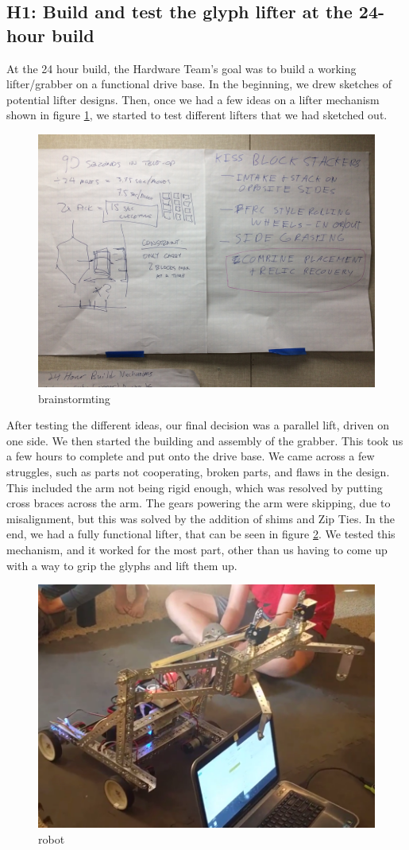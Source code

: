 \documentclass{article}
\begin{document}
\subsection{H1: Build and test the glyph lifter at the 24-hour build}

At the 24 hour build, the Hardware Team's goal was to build a working lifter/grabber on a functional drive base. In the beginning, we drew sketches of potential lifter designs. Then, once we had a few ideas on a lifter mechanism shown in figure \ref{fig:brainstorm}, we started to test different lifters that we had sketched out. 
\begin{figure}[h]
    \centering
    \includegraphics[width=.6\textwidth]{01/images/brainstorm.jpg}
    \caption{brainstormting}
    \label{fig:brainstorm}
\end{figure}
After testing the different ideas, our final decision was a parallel lift, driven on one side. We then started the building and assembly of the grabber. This took us a few hours to complete and put onto the drive base. We came across a few struggles, such as parts not cooperating, broken parts, and flaws in the design. This included the arm not being rigid enough, which was resolved by putting cross braces across the arm. The gears powering the arm were skipping, due to misalignment, but this was solved by the addition of shims and Zip Ties. In the end, we had a fully functional lifter, that can be seen in figure \ref{fig:robot}. We tested this mechanism, and it worked for the most part, other than us having to come up with a way to grip the glyphs and lift them up. 
\begin{figure}[h]
    \centering
    \includegraphics[width=.6\textwidth]{01/images/robot.png}
    \caption{robot}
    \label{fig:robot}
\end{figure}
\end{document}

